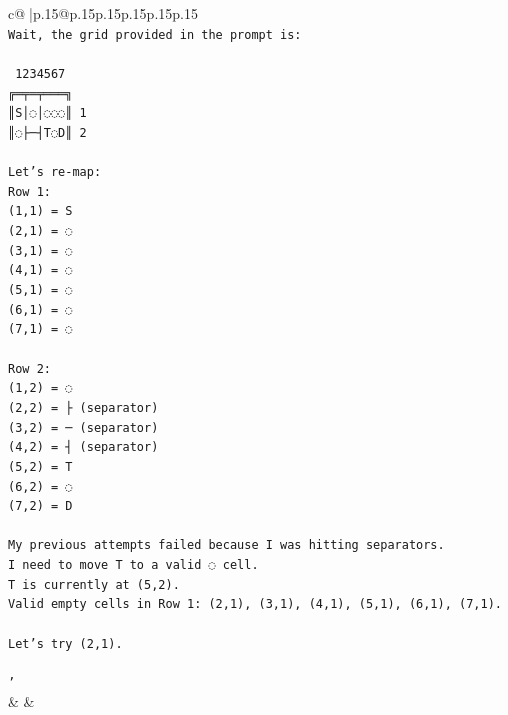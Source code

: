 \documentclass{article}
\begin{document}
{\begin{supertabular}{c@{$\;$}|p{.15\linewidth}@{}p{.15\linewidth}p{.15\linewidth}p{.15\linewidth}p{.15\linewidth}p{.15\linewidth}}
{{{\\ 
\texttt{Wait, the grid provided in the prompt is:} \\
\\ 
\texttt{ 1234567} \\
\texttt{╔═╤═╤═══╗} \\
\texttt{║S│◌│◌◌◌║ 1} \\
\texttt{║◌├─┤T◌D║ 2} \\
\\ 
\texttt{Let's re{-}map:} \\
\texttt{Row 1:} \\
\texttt{(1,1) = S} \\
\texttt{(2,1) = ◌} \\
\texttt{(3,1) = ◌} \\
\texttt{(4,1) = ◌} \\
\texttt{(5,1) = ◌} \\
\texttt{(6,1) = ◌} \\
\texttt{(7,1) = ◌} \\
\\ 
\texttt{Row 2:} \\
\texttt{(1,2) = ◌} \\
\texttt{(2,2) = ├ (separator)} \\
\texttt{(3,2) = ─ (separator)} \\
\texttt{(4,2) = ┤ (separator)} \\
\texttt{(5,2) = T} \\
\texttt{(6,2) = ◌} \\
\texttt{(7,2) = D} \\
\\ 
\texttt{My previous attempts failed because I was hitting separators.} \\
\texttt{I need to move T to a valid ◌ cell.} \\
\texttt{T is currently at (5,2).} \\
\texttt{Valid empty cells in Row 1: (2,1), (3,1), (4,1), (5,1), (6,1), (7,1).} \\
\\ 
\texttt{Let's try (2,1).} \\
\\ 
\texttt{'} \\
            }
        }
    }
    & & \\ \\


\end{supertabular}}
\end{document}
